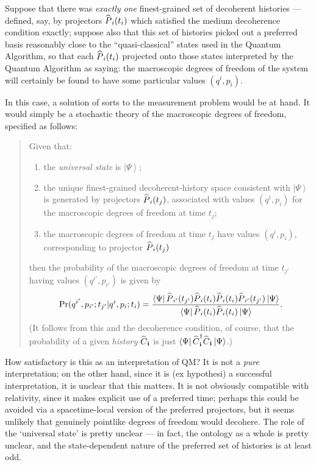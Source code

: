 \documentclass[12pt]{article}
\newcommand{\be}{\begin{equation}}
\newcommand{\ee}{\end{equation}}
\newcommand{\vctr}[1]{\ensuremath{\mathbf{ #1 }}}
\newcommand{\ket}[1]{\ensuremath{\left|  #1 \right\rangle}}
\newcommand{\bra}[1]{\ensuremath{\left\langle #1 \right|}}
\newcommand{\matel}[3]{\ensuremath{\bra{#1} #2 \ket{#3}}}
\newcommand{\op}[1]{\ensuremath{\widehat{\textsf{\ensuremath{#1}}}}}
\newcommand{\opad}[1]{\ensuremath{\op{#1}^{\dagger}}}
\begin{document}
Suppose that there was \emph{exactly one} finest-grained set of decoherent histories --- defined, say, by projectors $\op{P}_i(t_i)$ which satisfied the medium decoherence condition exactly; suppose also that this set of histories picked out a preferred basis reasonably close to the ``quasi-classical'' states used in the Quantum Algorithm, so that each $\op{P}_i(t_i)$ projected onto those states interpreted by the Quantum Algorithm as saying: the macroscopic degrees of freedom of the system will certainly be found to have some particular values $(q^i,p_i)$.

In this case, a solution of sorts to the measurement problem would be at hand. It would simply be a stochastic theory of the macroscopic degrees of freedom, specified as follows:
\begin{quote}
Given that:
\begin{enumerate}
\item the \emph{universal state} is \ket{\Psi};
\item the unique finest-grained decoherent-history space consistent with \ket{\Psi} is generated by projectors $\op{P}_i(t_j)$, associated with values $(q^i,p_i)$ for the macroscopic degrees of freedom at time $t_j$;
\item the macroscopic degrees of freedom at time $t_j$ have values $(q^i,p_i)$, corresponding to projector $\op{P}_i(t_j)$
\end{enumerate} 
then the probability of the macroscopic degrees of freedom at time $t_{j'}$ having values $(q^{i'},p_{i'})$
is given by 
\be
\Pr (q^{i'},p_{i'};t_{j'}| q^i,p_i;t_i)=\frac{\matel{\Psi}{\op{P}_{i'}(t_{j'})\op{P}_i(t_i)\op{P}_i(t_i)\op{P}_{i'}(t_{j'})}{\Psi}}{\matel{\Psi}{\op{P}_i(t_i)\op{P}_i(t_i)}{\Psi}}.
\ee
(It follows from this and the decoherence condition, of course, that the probability of a given \emph{history} $\op{C}_\vctr{i}$ is just \matel{\Psi}{\opad{C}_\vctr{i}\op{C}_\vctr{i}}{\Psi}.)
\end{quote}
How satisfactory is this as an interpretation of QM? It is not a \emph{pure} interpretation; on the other hand, since it is (ex hypothesi) a successful interpretation, it is unclear that this matters. It is not obviously compatible with relativity, since it makes explicit use of a preferred time; perhaps this could be avoided via a spacetime-local version of the preferred projectors, but it seems unlikely that genuinely pointlike degrees of freedom would decohere. The role of the `universal state' is pretty unclear --- in fact, the ontology as a whole is pretty unclear, and the state-dependent nature of the preferred set of histories is at least odd. 
\end{document}
